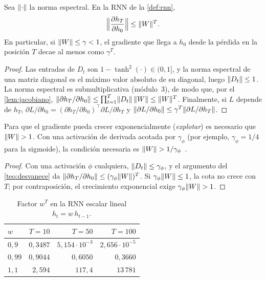 \begin{teorema}\label{teo:desvanece}
Sea $\lVert\cdot\rVert$ la norma espectral. En la RNN de la \cref{def:rnn},
\[
\Bigl\lVert\frac{\partial h_T}{\partial h_0}\Bigr\rVert\le\lVert W\rVert^{T}.
\]
En particular, si $\lVert W\rVert\le\gamma<1$, el gradiente que llega a $h_0$ desde la pérdida en la posición $T$ decae al menos como $\gamma^{T}$.
\end{teorema}

\begin{proof}
Las entradas de $D_t$ son $1-\tanh^{2}(\cdot)\in(0,1]$, y la norma espectral de una matriz diagonal es el máximo valor absoluto de su diagonal, luego $\lVert D_t\rVert\le 1$. La norma espectral es submultiplicativa (módulo~3), de modo que, por el \cref{lem:jacobiano},
$\lVert\partial h_T/\partial h_0\rVert\le\prod_{t=1}^{T}\lVert D_t\rVert\,\lVert W\rVert\le\lVert W\rVert^{T}$. Finalmente, si $L$ depende de $h_T$, $\partial L/\partial h_0=(\partial h_T/\partial h_0)^{\top}\partial L/\partial h_T$ y $\lVert\partial L/\partial h_0\rVert\le\gamma^{T}\lVert\partial L/\partial h_T\rVert$.
\end{proof}

\begin{corolario}\label{cor:explota}
Para que el gradiente pueda crecer exponencialmente (\emph{explotar}) es necesario que $\lVert W\rVert>1$. Con una activación de derivada acotada por $\gamma_{\phi}$ (por ejemplo, $\gamma_{\phi}=1/4$ para la sigmoide), la condición necesaria es $\lVert W\rVert>1/\gamma_{\phi}$~\cite[§2.1]{pascanu}.
\end{corolario}

\begin{proof}
Con una activación $\phi$ cualquiera, $\lVert D_t\rVert\le\gamma_{\phi}$, y el argumento del \cref{teo:desvanece} da $\lVert\partial h_T/\partial h_0\rVert\le(\gamma_{\phi}\lVert W\rVert)^{T}$. Si $\gamma_{\phi}\lVert W\rVert\le 1$, la cota no crece con $T$; por contraposición, el crecimiento exponencial exige $\gamma_{\phi}\lVert W\rVert>1$.
\end{proof}

\begin{table}[h]
\centering\small
\caption{Factor $w^{T}$ en la RNN escalar lineal $h_t=w\,h_{t-1}$.}\label{tab:wT}
\begin{tabular}{@{}lrrr@{}}
\toprule
$w$ & $T=10$ & $T=50$ & $T=100$ \\
\midrule
$0{,}9$ & $0{,}3487$ & $5{,}154\cdot 10^{-3}$ & $2{,}656\cdot 10^{-5}$ \\
$0{,}99$ & $0{,}9044$ & $0{,}6050$ & $0{,}3660$ \\
$1{,}1$ & $2{,}594$ & $117{,}4$ & $13\,781$ \\
\bottomrule
\end{tabular}
\end{table}

